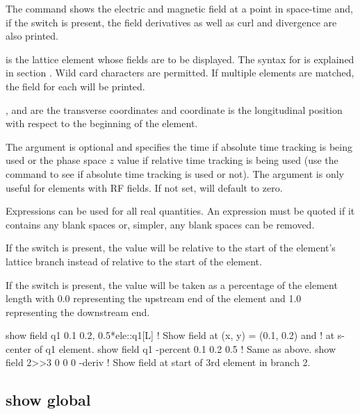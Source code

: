 {{{{{{{{The  command shows the electric and magnetic field at a point in space-time and, if
the  switch is present, the field derivatives as well as curl and divergence are
also printed.

 is the lattice element whose fields are to be displayed. The syntax for  is
explained in section . Wild card characters are permitted. If multiple
elements are matched, the field for each will be printed.

, and  are the transverse coordinates and  coordinate is the longitudinal
position with respect to the beginning of the element. 

The  argument is optional and specifies the time if absolute time tracking is being
used or the phase space $z$ value if relative time tracking is being used (use the  command to see if absolute time tracking is used or not). The  argument is
only useful for elements with RF fields. If not set,  will default to zero.

Expressions can be used for all real quantities. An expression must be quoted if it contains any
blank spaces or, simpler, any blank spaces can be removed.

If the  switch is present, the  value will be relative to the start
of the element's lattice branch instead of relative to the start of the element.

If the  switch is present, the  value will be taken as a percentage
of the element length with 0.0 representing the upstream end of the element and 1.0 representing
the downstream end.

\begin{example}
  show field q1 0.1  0.2, 0.5*ele::q1[L]  ! Show field at (x, y) = (0.1, 0.2) and 
                                          !    at s-center of q1 element.
  show field q1 -percent 0.1  0.2 0.5     ! Same as above.
  show field 2>>3 0 0 0 -deriv            ! Show field at start of 3rd element in branch 2.
\end{example}


\subsection{show global}
\label{s:show.global}

}}}}}}}}
